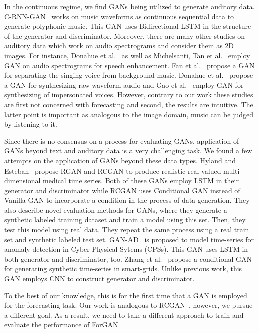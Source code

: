 \documentclass{ieeeaccess}
\begin{document}
In the continuous regime, we find GANs being utilized to generate auditory data. C-RNN-GAN~\cite{mogren2016c} works on music waveforms as continuous sequential data to generate polyphonic music. This GAN uses  Bidirectional LSTM in the structure of the generator and discriminator.  Moreover, there are many other studies on auditory data which work on audio spectrograms and consider them as 2D images. For instance, Donahue et al.~\cite{donahue2018exploring} as well as Michelsanti, Tan et al.~\cite{michelsanti2017conditional} employ GAN on audio spectrograms for speech enhancement. Fan et al.~\cite{fan2018svsgan} propose a GAN for separating the singing voice from background music. Donahue et al.~\cite{DBLP:journals/corr/abs-1802-04208} propose a GAN for synthesizing raw-waveform audio and Gao et al.~\cite{gao2018voice} employ GAN for synthesizing of impersonated voices. However, contrary to our work these studies are first not concerned with forecasting and second, the results are intuitive. The latter point is important as analogous to the image domain, music can be judged by listening to it. 

Since there is no consensus on a process for evaluating GANs,  application of GANs beyond text and auditory data is a very challenging task. We found a few attempts on the application of GANs beyond these data types. Hyland and Esteban~\cite{esteban2017real} propose RGAN and RCGAN to produce realistic real-valued multi-dimensional medical time series. Both of these GANs employ LSTM in their generator and discriminator while RCGAN uses Conditional GAN instead of Vanilla GAN to incorporate a condition in the process of data generation. 
They also describe novel evaluation methods for GANs, where they generate a synthetic labeled training dataset and train a model using this set. Then, they test this model using real data. They repeat the same process using a real train set and synthetic labeled test set. GAN-AD~\cite{li2018anomaly} is proposed to model time-series for anomaly detection in Cyber-Physical Sytems (CPSs). This GAN uses LSTM in both generator and discriminator, too. Zhang et al.~\cite{zhanggenerative} propose a conditional GAN for generating synthetic time-series in smart-grids. Unlike previous work, this GAN employs CNN to construct generator and discriminator.

To the best of our knowledge, this is for the first time that a GAN is employed for the forecasting task. Our work is analogous to RCGAN~\cite{esteban2017real}, however, we pursue a different goal. As a result, we need to take a different approach to train and evaluate the performance of ForGAN.
\end{document}
